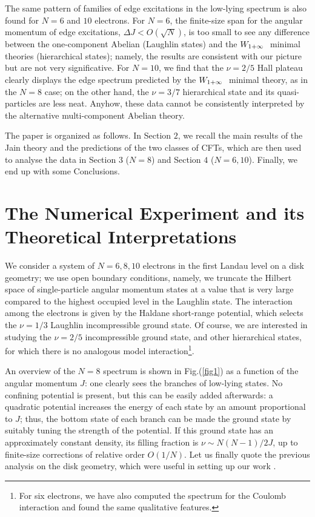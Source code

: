 The same pattern of families of edge excitations 
in the low-lying spectrum is also found for $N=6$ and $10$ electrons.
For $N=6$, the finite-size span for the angular momentum of edge 
excitations, $\Delta J < O(\sqrt{N})$, is too small to see
any difference between the one-component Abelian (Laughlin states) 
and the $W_{1+\infty}\ $ minimal theories (hierarchical states);
namely, the results are consistent with our picture but are
not very significative.
For $N=10$, we find that the $\nu=2/5$ Hall plateau clearly displays
the edge spectrum predicted by the $W_{1+\infty}\ $ minimal theory, as
in the $N=8$ case; on the other hand, the $\nu=3/7$ hierarchical state 
and its quasi-particles are less neat.
Anyhow, these data cannot be consistently interpreted
by the alternative multi-component Abelian theory.

The paper is organized as follows.
In Section $2$, we recall the main results of the Jain theory and
the predictions of the two classes of CFTs, which are then used to
analyse the data in Section $3$ ($N=8$) and Section $4$ ($N=6,10$).
Finally, we end up with some Conclusions. 



\section{The Numerical Experiment and its Theoretical Interpretations}

We consider a system of $N=6,8,10$ electrons in the first Landau
level on a disk geometry;
we use open boundary conditions, namely, we truncate the 
Hilbert space of single-particle angular momentum
states at a value that is very large compared to the highest occupied
level in the Laughlin state. 
The interaction among the electrons is given by the Haldane
short-range potential, which selects the $\nu=1/3$ Laughlin
incompressible ground state.
Of course, we are interested in studying the $\nu=2/5$ 
incompressible ground state, and other hierarchical states,
for which there is no analogous model interaction\footnote{
For six electrons, 
we have also computed the spectrum for the Coulomb interaction
and found the same qualitative features.}.

An overview of the $N=8$ spectrum is shown in Fig.(\ref{fig1})
as a function of the angular momentum $J$: 
one clearly sees the branches of low-lying states.
No confining potential is present, but this can be easily added 
afterwards: a quadratic potential increases the energy of each state
by an amount proportional to $J$; thus, 
the bottom state of each branch can be made
the ground state by suitably tuning the strength of the potential.
If this ground state has an approximately constant density, 
its filling fraction is $\nu\sim N(N-1)/2J$, up to finite-size corrections
of relative order $O(1/N)$.
Let us finally quote the previous analysis on the disk geometry,
which were useful in setting up our work \cite{wen}\cite{deja}\cite{kaap}.

